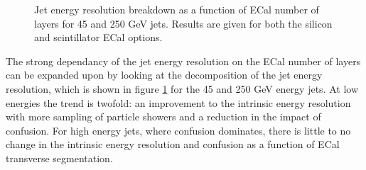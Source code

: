 \begin{figure}
\caption[Jet energy resolution breakdown as a function of ECal number of layers for 45 and 250 GeV jets.  Results are given for both the silicon and scintillator ECal options.]{Jet energy resolution breakdown as a function of ECal number of layers for 45 and 250 GeV jets.  Results are given for both the silicon and scintillator ECal options.}
\label{fig:ecalnlayersbreak}
\end{figure}

The strong dependancy of the jet energy resolution on the ECal number of layers can be expanded upon by looking at the decomposition of the jet energy resolution, which is shown in figure \ref{fig:ecalnlayersbreak} for the 45 and 250 GeV energy jets.  At low energies the trend is twofold: an improvement to the intrinsic energy resolution with more sampling of particle showers and a reduction in the impact of confusion.  For high energy jets, where confusion dominates, there is little to no change in the intrinsic energy resolution and confusion as a function of ECal transverse segmentation.  

